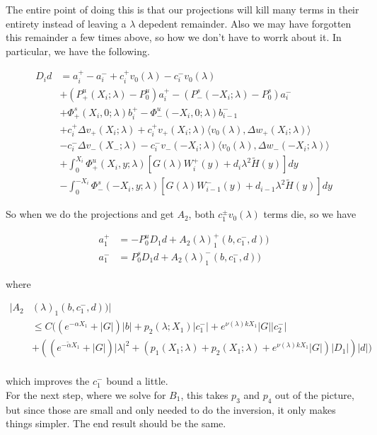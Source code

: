 \documentclass[12pt]{article}
\begin{document}
\begin{enumerate}
The entire point of doing this is that our projections will kill many terms in their entirety instead of leaving a $\lambda$ depedent remainder. Also we may have forgotten this remainder a few times above, so how we don't have to worrk about it. In particular, we have the following.

\begin{align*}
D_i d &= a_i^+ - a_i^- + c_i^+ v_0(\lambda) - c_i^- v_0(\lambda) \\
&+ (P^u_+(X_i; \lambda) - P_0^u)a_i^+ - (P^s_-(-X_i; \lambda) - P_0^s)a_i^- \\
&+ \Phi^s_+(X_i, 0; \lambda)b_i^+ - \Phi^u_-(-X_i, 0; \lambda)b_{i-1}^- \\
&+ c_i^+ \Delta v_+(X_i; \lambda) + c_i^+ v_+(X_i; \lambda) \langle v_0(\lambda), \Delta w_+(X_i; \lambda) \rangle \\
&- c_i^- \Delta v_-(X_-; \lambda) - c_i^- v_-(-X_i; \lambda) \langle v_0(\lambda), \Delta w_-(-X_i; \lambda) \rangle \\
&+ \int_0^{X_i} \Phi^u_+(X_i, y; \lambda) [ G(\lambda)W_i^+(y) + d_i \lambda^2 \tilde{H}(y) ] dy \\
&- \int_0^{-X_i} \Phi^s_-(-X_i, y; \lambda) [ G(\lambda)W_{i-1}^-(y) + d_{i-1} \lambda^2 \tilde{H}(y) ] dy
\end{align*}

So when we do the projections and get $A_2$, both $c_1^\pm v_0(\lambda)$ terms die, so we have

\begin{align*}
a_1^+ &= -P^u_0 D_1 d + A_2(\lambda)_1^+(b, c_1^-, d))\\
a_1^- &=  P^s_0 D_1 d + A_2(\lambda)_1^-(b, c_1^-, d))
\end{align*}

where

\begin{align*}
|A_2&(\lambda)_1(b, c_1^-, d))| \\
&\leq C( (e^{-\alpha X_1} + |G|) |b| + p_2(\lambda; X_1) |c_1^-| + e^{\nu(\lambda)k X_1} |G||c_2^-| \\
&+ ((e^{-\tilde{\alpha} X_1} + |G|) |\lambda|^2 + (p_1(X_1; \lambda) + p_2(X_1; \lambda) + e^{\nu(\lambda)k X_1} |G|)|D_1|)|d| ) \\
\end{align*}

which improves the $c_1^-$ bound a little.\\

For the next step, where we solve for $B_1$, this takes $p_3$ and $p_4$ out of the picture, but since those are small and only needed to do the inversion, it only makes things simpler. The end result should be the same.\\


\end{enumerate}
\end{document}
